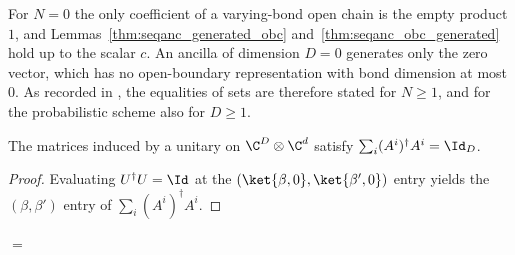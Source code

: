 \begin{remark}
    For $N=0$ the only coefficient of a varying-bond open chain is the empty
    product $1$, and Lemmas~\ref{thm:seqanc_generated_obc}
    and~\ref{thm:seqanc_obc_generated} hold up to the scalar $c$. An ancilla
    of dimension $D=0$ generates only the zero vector, which has no
    open-boundary representation with bond dimension at most $0$. As recorded in
    \cite{gap:pgvwc07_sequential_with_ancilla_positive_length}, the
    equalities of sets are therefore stated for $N\ge1$, and for the
    probabilistic scheme also for $D\ge1$.
\end{remark}

\begin{lemma}
    \label{thm:seqanc_step_isometry}
    \leanok
    The matrices induced by a unitary on $\C^D\otimes\C^d$ satisfy
    $\sum_i(A^i)^\dagger A^i=\Id_D$.
\end{lemma}
\begin{proof}
    \leanok
    Evaluating $U^\dagger U=\Id$ at the $(\ket{\beta,0},\ket{\beta',0})$ entry yields the $(\beta,\beta')$ entry of $\sum_i(A^i)^\dagger A^i$.
\end{proof}

\begin{center}
    \tenkzkernel
    \begin{tenkz}[rows={wire,wire}, cols=1, bonds=none, west=cup]
    \end{tenkz}
    \quad $=$ \quad
    \begin{tenkz}[rows={wire,wire}, cols=1, bonds=none, west=cup]
        \tn[at=(1,1), skin=none, ports={180:virtual, 0:virtual:$\beta'$}]{}
        \tn[at=(2,1), skin=none, ports={180:virtual, 0:virtual:$\beta$}]{}
    \end{tenkz}
\end{center}

